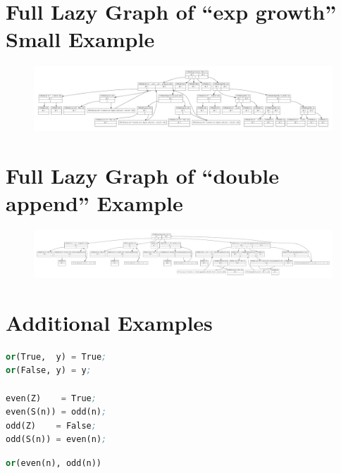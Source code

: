\documentclass[submission,copyright,creativecommons]{eptcs}
\begin{document}
\clearpage
\section{Full Lazy Graph of ``exp growth'' Small Example}\label{app:ExpGrowthSmallGraphSet}

\begin{figure}[H]
  \centering
  \includegraphics[width=0.9\textheight,angle=90]{inc/expGrowthSmallGraphSet.pdf}
\end{figure}

\clearpage
\section{Full Lazy Graph of ``double append'' Example}\label{app:AppAppGraphSet}

\begin{figure}[H]
  \centering
  \includegraphics[width=0.9\textheight,angle=90]{inc/appAppGraphSet.pdf}
\end{figure}

\clearpage
\section{Additional Examples}\label{app:MoreExapmles}

\begin{lstlisting}[language=Lisp,keywords={},caption=Even-or-odd Program]
or(True,  y) = True;
or(False, y) = y;

even(Z)    = True;
even(S(n)) = odd(n);
odd(Z)    = False;
odd(S(n)) = even(n);
\end{lstlisting}

\begin{lstlisting}[language=Lisp,keywords={},caption=Even-or-odd Expression]
or(even(n), odd(n))
\end{lstlisting}
\end{document}
